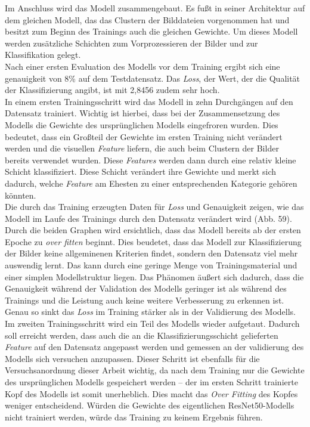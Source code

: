 \documentclass[a4paper,12pt,ngerman]{article}
\begin{document}
Im Anschluss wird das Modell zusammengebaut. Es fußt in seiner Architektur auf dem gleichen Modell, das das Clustern der Bilddateien vorgenommen hat und besitzt zum Beginn des Trainings auch die gleichen Gewichte. Um dieses Modell werden zusätzliche Schichten zum Vorprozessieren der Bilder und zur Klassifikation gelegt. \\
Nach einer ersten Evaluation des Modells vor dem Training ergibt sich eine genauigkeit von 8\% auf dem Testdatensatz. Das \textit{Loss}, der Wert, der die Qualität der Klassifizierung angibt, ist mit 2,8456 zudem sehr hoch. \\
In einem ersten Trainingsschritt wird das Modell in zehn Durchgängen auf den Datensatz trainiert. Wichtig ist hierbei, dass bei der Zusammensetzung des Modells die Gewichte des ursprünglichen Modells eingefroren wurden. Dies bedeutet, dass ein Großteil der Gewichte im ersten Training nicht verändert werden und die visuellen \textit{Feature} liefern, die auch beim Clustern der Bilder bereits verwendet wurden. Diese \textit{Features} werden dann durch eine relativ kleine Schicht klassifiziert. Diese Schicht verändert ihre Gewichte und merkt sich dadurch, welche \textit{Feature} am Ehesten zu einer entsprechenden Kategorie gehören könnten. \\
Die durch das Training erzeugten Daten für \textit{Loss} und Genauigkeit zeigen, wie das Modell im Laufe des Trainings durch den Datensatz verändert wird (Abb. 59).  Durch die beiden Graphen wird ersichtlich, dass das Modell bereits ab der ersten Epoche zu \textit{over fitten} beginnt. Dies beudetet, dass das Modell zur Klassifizierung der Bilder keine allgeminenen Kriterien findet, sondern den Datensatz viel mehr auswendig lernt. Das kann durch eine geringe Menge von Trainingsmaterial und einer simplen Modellstruktur liegen. Das Phänomen äußert sich dadurch, dass die Genauigkeit während der Validation des Modells geringer ist als während des Trainings und die Leistung auch keine weitere Verbesserung zu erkennen ist. Genau so sinkt das \textit{Loss} im Training stärker als in der Validierung des Modells. \\
Im zweiten Trainingsschritt wird ein Teil des Modells wieder aufgetaut. Dadurch soll erreicht werden, dass auch die an die Klassifizierungsschicht gelieferten \textit{Feature} auf den Datensatz angepasst werden und gemessen an der validierung des Modells sich versuchen anzupassen. Dieser Schritt ist ebenfalls für die Versuchsanordnung dieser Arbeit wichtig, da nach dem Training nur die Gewichte des ursprünglichen Modells gespeichert werden -- der im ersten Schritt trainierte Kopf des Modells ist somit unerheblich. Dies macht das \textit{Over Fitting} des Kopfes weniger entscheidend. Würden die Gewichte des eigentlichen ResNet50-Modells nicht trainiert werden, würde das Training zu keinem Ergebnis führen. \\
\end{document}
